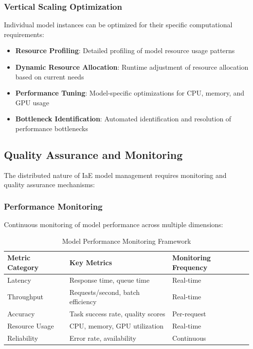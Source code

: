 \subsubsection{Vertical Scaling Optimization}

Individual model instances can be optimized for their specific computational requirements:

\begin{itemize}
    \item \textbf{Resource Profiling}: Detailed profiling of model resource usage patterns
    \item \textbf{Dynamic Resource Allocation}: Runtime adjustment of resource allocation based on current needs
    \item \textbf{Performance Tuning}: Model-specific optimizations for CPU, memory, and GPU usage
    \item \textbf{Bottleneck Identification}: Automated identification and resolution of performance bottlenecks
\end{itemize}

\subsection{Quality Assurance and Monitoring}

The distributed nature of IaE model management requires monitoring and quality assurance mechanisms:

\subsubsection{Performance Monitoring}

Continuous monitoring of model performance across multiple dimensions:

\begin{table}[ht]
\centering
\begin{tabular}{@{}lll@{}}
\toprule
\textbf{Metric Category} & \textbf{Key Metrics} & \textbf{Monitoring Frequency} \\
\midrule
Latency & Response time, queue time & Real-time \\
Throughput & Requests/second, batch efficiency & Real-time \\
Accuracy & Task success rate, quality scores & Per-request \\
Resource Usage & CPU, memory, GPU utilization & Real-time \\
Reliability & Error rate, availability & Continuous \\
\bottomrule
\end{tabular}
\caption{Model Performance Monitoring Framework}
\label{tab:model-monitoring}
\end{table}

